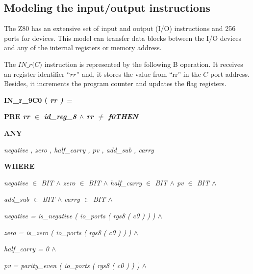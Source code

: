 \documentclass[a4paper]{llncs}
\newcommand{\footnoterecall}[1]{
  \footnotemark[\value{#1}]
}
\begin{document}
\subsection{Modeling the input/output instructions}
\label{sec:modelingIO}
The Z80 has an extensive set of input and output (I/O) instructions and 256 ports for
devices. This model can transfer data blocks between the I/O devices and any
of the internal registers or memory address.

The $\textit{IN\_r(C)}$\footnoterecall{myfootnote} instruction is represented
by the following B operation. It receives an register identifier ``$\textit{rr}$'' and, it stores the value from ``rr'' in the $\textit{C}$ port address. Besides, it increments the program counter and updates the flag registers.

\hspace*{0.0in}\bf IN\_r\_9C0 \rm ( \it rr \rm ) \rm =

\hspace*{0.0in}\bf PRE \it rr  $\in$  \it id\_reg\_8  $\land$  \it rr  $\not =$  \it f0\hspace*{0.15in}\bf THEN

\hspace*{0.20in}\bf ANY

\hspace*{0.40in}\it negative \rm , \it zero \rm , \it half\_carry \rm , \it pv \rm , \it add\_sub \rm , \it carry

\hspace*{0.20in}\bf WHERE 

\hspace*{0.40in}\it negative $\in$ \it BIT $\land$ \it zero $\in$ \it BIT $\land$ \it half\_carry $\in$ \it BIT 
$\land$ \it pv $\in$ \it BIT $\land$

 \hspace*{0.40in}\it add\_sub $\in$ \it BIT $\land$ \it carry $\in$ \it BIT  $\land$

\hspace*{0.40in}\it negative \rm = \it is\_negative \rm ( \it io\_ports \rm ( \it rgs8 \rm ( \it c0 \rm ) \rm ) \rm )  $\land$ 

\hspace*{0.40in}\it zero \rm = \it is\_zero \rm ( \it io\_ports \rm ( \it rgs8 \rm ( \it c0 \rm ) \rm ) \rm )  $\land$ 

\hspace*{0.40in}\it half\_carry \rm = \rm 0  $\land$ 

\hspace*{0.40in}\it pv \rm = \it parity\_even \rm ( \it io\_ports \rm ( \it rgs8 \rm ( \it c0 \rm ) \rm ) \rm ) $\land$
\end{document}
